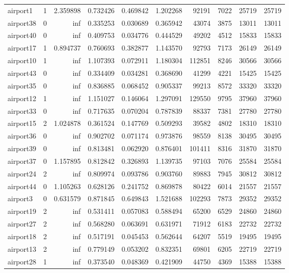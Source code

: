 \begin{longtable}{|l|r|r|r|r|r|r|r|r|r|}
airport1 & 1 & 2.359898 & 0.732426 & 0.469842 & 1.202268 & 92191 & 7022 & 25719 & 25719 \\
airport38 & 0 & inf & 0.335253 & 0.030689 & 0.365942 & 43074 & 3875 & 13011 & 13011 \\
airport40 & 0 & inf & 0.409753 & 0.034776 & 0.444529 & 49202 & 4512 & 15833 & 15833 \\
airport17 & 1 & 0.894737 & 0.760693 & 0.382877 & 1.143570 & 92793 & 7173 & 26149 & 26149 \\
airport10 & 1 & inf & 1.107393 & 0.072911 & 1.180304 & 112851 & 8246 & 30566 & 30566 \\
airport43 & 0 & inf & 0.334409 & 0.034281 & 0.368690 & 41299 & 4221 & 15425 & 15425 \\
airport35 & 0 & inf & 0.836885 & 0.068452 & 0.905337 & 99213 & 8572 & 33320 & 33320 \\
airport12 & 1 & inf & 1.151027 & 0.146064 & 1.297091 & 129550 & 9795 & 37960 & 37960 \\
airport33 & 0 & inf & 0.717635 & 0.070204 & 0.787839 & 88337 & 7381 & 27780 & 27780 \\
airport15 & 2 & 1.024878 & 0.361524 & 0.147769 & 0.509293 & 39582 & 4802 & 18310 & 18310 \\
airport36 & 0 & inf & 0.902702 & 0.071174 & 0.973876 & 98559 & 8138 & 30495 & 30495 \\
airport39 & 0 & inf & 0.813481 & 0.062920 & 0.876401 & 101411 & 8316 & 31870 & 31870 \\
airport37 & 0 & 1.157895 & 0.812842 & 0.326893 & 1.139735 & 97103 & 7076 & 25584 & 25584 \\
airport24 & 2 & inf & 0.809974 & 0.093786 & 0.903760 & 89883 & 7945 & 30812 & 30812 \\
airport44 & 0 & 1.105263 & 0.628126 & 0.241752 & 0.869878 & 80422 & 6014 & 21557 & 21557 \\
airport3 & 0 & 0.631579 & 0.871845 & 0.649843 & 1.521688 & 102293 & 7873 & 29352 & 29352 \\
airport19 & 2 & inf & 0.531411 & 0.057083 & 0.588494 & 65200 & 6529 & 24860 & 24860 \\
airport27 & 2 & inf & 0.568280 & 0.063691 & 0.631971 & 71912 & 6183 & 22732 & 22732 \\
airport18 & 2 & inf & 0.517191 & 0.045453 & 0.562644 & 64207 & 5519 & 19495 & 19495 \\
airport13 & 2 & inf & 0.779149 & 0.053202 & 0.832351 & 69801 & 6205 & 22719 & 22719 \\
airport28 & 1 & inf & 0.373540 & 0.048369 & 0.421909 & 44750 & 4369 & 15388 & 15388 \\

\end{longtable}
